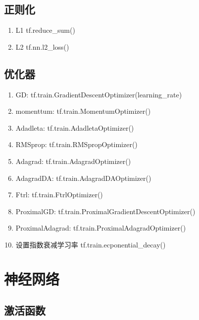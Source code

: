 \documentclass[UTF8]{article}%
\begin{document}
		\subsection{正则化}
			\begin{enumerate}
				\item L1   tf.reduce\_sum()
				\item L2  tf.nn.l2\_loss()
			\end{enumerate}
		\subsection{优化器}
			\begin{enumerate}
				\item \color{red}GD:  \color{black} tf.train.GradientDescentOptimizer(learning\_rate)
				\item \color{red}momenttum: \color{black}  tf.train.MomentumOptimizer()
				\item \color{red}Adadleta:  \color{black} tf.train.AdadletaOptimizer()
				\item \color{red}RMSprop: \color{black}  tf.train.RMSpropOptimizer()
				\item \color{red}Adagrad: \color{black}  tf.train.AdagradOptimizer()
				\item \color{red}AdagradDA: \color{black}  tf.train.AdagradDAOptimizer()
				\item \color{red}Ftrl:  \color{black} tf.train.FtrlOptimizer()
				\item \color{red}ProximalGD: \color{black}  tf.train.ProximalGradientDescentOptimizer()
				\item \color{red}ProximalAdagrad: \color{black}  tf.train.ProximalAdagradOptimizer()
				\item 设置指数衰减学习率  tf.train.ecponential\_decay()
				  	
			\end{enumerate}
	
	\section{神经网络}
	\subsection{激活函数}
\end{document}
